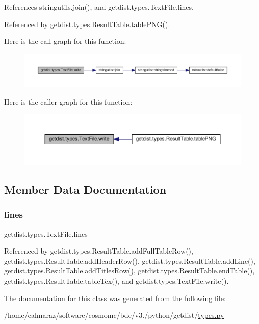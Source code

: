 References stringutils.\+join(), and getdist.\+types.\+Text\+File.\+lines.



Referenced by getdist.\+types.\+Result\+Table.\+table\+P\+N\+G().

Here is the call graph for this function\+:
\nopagebreak
\begin{figure}[H]
\begin{center}
\leavevmode
\includegraphics[width=350pt]{classgetdist_1_1types_1_1TextFile_a9e83c4be7d7b67c574f6a2d1eb668ccc_cgraph}
\end{center}
\end{figure}
Here is the caller graph for this function\+:
\nopagebreak
\begin{figure}[H]
\begin{center}
\leavevmode
\includegraphics[width=350pt]{classgetdist_1_1types_1_1TextFile_a9e83c4be7d7b67c574f6a2d1eb668ccc_icgraph}
\end{center}
\end{figure}


\subsection{Member Data Documentation}
\mbox{\label{classgetdist_1_1types_1_1TextFile_a77909f5b9e19390f0f00f8cf7a9147c3}} 
\subsubsection{\texorpdfstring{lines}{lines}}
{\footnotesize\ttfamily getdist.\+types.\+Text\+File.\+lines}



Referenced by getdist.\+types.\+Result\+Table.\+add\+Full\+Table\+Row(), getdist.\+types.\+Result\+Table.\+add\+Header\+Row(), getdist.\+types.\+Result\+Table.\+add\+Line(), getdist.\+types.\+Result\+Table.\+add\+Titles\+Row(), getdist.\+types.\+Result\+Table.\+end\+Table(), getdist.\+types.\+Result\+Table.\+table\+Tex(), and getdist.\+types.\+Text\+File.\+write().



The documentation for this class was generated from the following file\+:\begin{DoxyCompactItemize}
\item 
/home/ealmaraz/software/cosmomc/bde/v3./python/getdist/\mbox{\hyperlink{types_8py}{types.\+py}}\end{DoxyCompactItemize}
